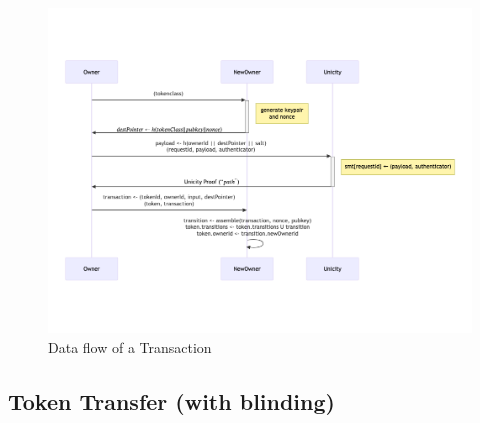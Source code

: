 \documentclass{article}
\begin{document}
\begin{figure}[!htbp]
        \begin{center}
        \includegraphics[width=\textwidth]{unicity-tx}
        \caption{Data flow of a Transaction}\label{fig:tx}
        \end{center}
\end{figure}



\subsection{Token Transfer (with blinding)}
\end{document}
